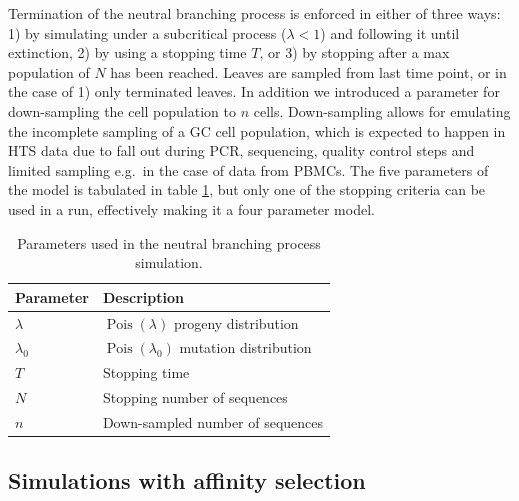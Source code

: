 Termination of the neutral branching process is enforced in either of three ways: 1) by simulating under a subcritical process ($\lambda < 1$) \cite{gwp} and following it until extinction, 2) by using a stopping time $T$, or 3) by stopping after a max population of $N$ has been reached.
Leaves are sampled from last time point, or in the case of 1) only terminated leaves.
In addition we introduced a parameter for down-sampling the cell population to $n$ cells.
Down-sampling allows for emulating the incomplete sampling of a GC cell population, which is expected to happen in HTS data due to fall out during PCR, sequencing, quality control steps and limited sampling e.g.\ in the case of data from PBMCs.
The five parameters of the model is tabulated in table \ref{neut_constants}, but only one of the stopping criteria can be used in a run, effectively making it a four parameter model.

\begin{table}[ht]
\centering
\begin{tabular}{ll}
Parameter    & Description \\ \hline
$\lambda$ & $\operatorname{Pois}(\lambda)$ progeny distribution \\
$\lambda_0$ & $\operatorname{Pois}(\lambda_0)$ mutation distribution \\
$T$ & Stopping time \\
$N$ & Stopping number of sequences \\
$n$ & Down-sampled number of sequences
\end{tabular}
\caption{
\label{neut_constants}
    Parameters used in the neutral branching process simulation.}
\end{table}






\subsection{Simulations with affinity selection}

